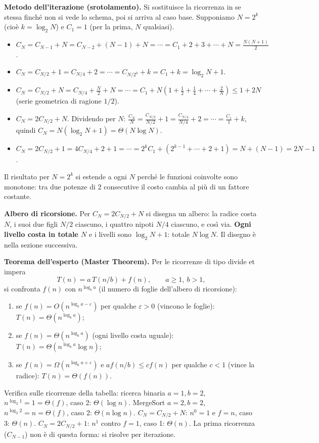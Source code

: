 \textbf{Metodo dell'iterazione (srotolamento).} Si sostituisce la ricorrenza in se
stessa finché non si vede lo schema, poi si arriva al caso base. Supponiamo
$N = 2^k$ (cioè $k = \log_2 N$) e $C_1 = 1$ (per la prima, $N$ qualsiasi).
\begin{itemize}
  \item $C_N = C_{N-1} + N = C_{N-2} + (N-1) + N = \cdots = C_1 + 2 + 3 + \cdots + N
        = \frac{N(N+1)}{2}$.
  \item $C_N = C_{N/2} + 1 = C_{N/4} + 2 = \cdots = C_{N/2^k} + k = C_1 + k = \log_2 N + 1$.
  \item $C_N = C_{N/2} + N = C_{N/4} + \frac{N}{2} + N = \cdots
        = C_1 + N\left(1 + \frac12 + \frac14 + \cdots + \frac{2}{N}\right) \le 1 + 2N$
        (serie geometrica di ragione $1/2$).
  \item $C_N = 2C_{N/2} + N$. Dividendo per $N$:
        $\frac{C_N}{N} = \frac{C_{N/2}}{N/2} + 1 = \frac{C_{N/4}}{N/4} + 2 = \cdots
        = \frac{C_1}{1} + k$, quindi $C_N = N(\log_2 N + 1) = \Theta(N \log N)$.
  \item $C_N = 2C_{N/2} + 1 = 4C_{N/4} + 2 + 1 = \cdots = 2^k C_1 + (2^{k-1} + \cdots + 2 + 1)
        = N + (N - 1) = 2N - 1$.
\end{itemize}
Il risultato per $N = 2^k$ si estende a ogni $N$ perché le funzioni coinvolte sono
monotone: tra due potenze di 2 consecutive il costo cambia al più di un fattore
costante.

\textbf{Albero di ricorsione.} Per $C_N = 2C_{N/2} + N$ si disegna un albero: la
radice costa $N$, i suoi due figli $N/2$ ciascuno, i quattro nipoti $N/4$ ciascuno, e
così via. \textbf{Ogni livello costa in totale $N$} e i livelli sono $\log_2 N + 1$:
totale $N \log N$. Il disegno è nella sezione successiva.

\textbf{Teorema dell'esperto (Master Theorem).} Per le ricorrenze di tipo divide et
impera
\[
T(n) = a\, T(n/b) + f(n), \qquad a \ge 1,\ b > 1,
\]
si confronta $f(n)$ con $n^{\log_b a}$ (il numero di foglie dell'albero di ricorsione):
\begin{enumerate}
  \item se $f(n) = O(n^{\log_b a - \varepsilon})$ per qualche $\varepsilon > 0$
        (vincono le foglie): $T(n) = \Theta(n^{\log_b a})$;
  \item se $f(n) = \Theta(n^{\log_b a})$ (ogni livello costa uguale):
        $T(n) = \Theta(n^{\log_b a} \log n)$;
  \item se $f(n) = \Omega(n^{\log_b a + \varepsilon})$ e $a f(n/b) \le c f(n)$ per
        qualche $c < 1$ (vince la radice): $T(n) = \Theta(f(n))$.
\end{enumerate}
Verifica sulle ricorrenze della tabella: ricerca binaria $a = 1, b = 2$,
$n^{\log_2 1} = 1 = \Theta(f)$, caso 2: $\Theta(\log n)$. MergeSort $a = 2, b = 2$,
$n^{\log_2 2} = n = \Theta(f)$, caso 2: $\Theta(n \log n)$. $C_N = C_{N/2} + N$:
$n^0 = 1$ e $f = n$, caso 3: $\Theta(n)$. $C_N = 2C_{N/2} + 1$: $n^1$ contro
$f = 1$, caso 1: $\Theta(n)$. La prima ricorrenza ($C_{N-1}$) non è di questa forma:
si risolve per iterazione.

